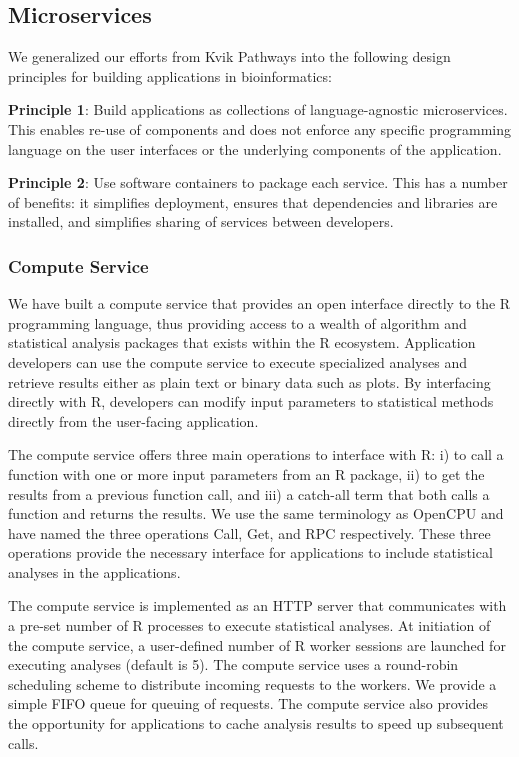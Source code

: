 \subsection{Microservices}\label{micrservices} 
We generalized our efforts from Kvik Pathways into the following design
principles for building applications in bioinformatics: 

\textbf{Principle 1}: Build applications as collections of language-agnostic
microservices. This enables re-use of components and does not enforce any
specific programming language on the user interfaces or the underlying
components of the application. 

\textbf{Principle 2}: Use software containers to package each service. This has
a number of benefits: it simplifies deployment, ensures that dependencies and
libraries are installed, and  simplifies sharing of services between
developers. 

\subsubsection{Compute Service}
We have built a compute service that provides an open interface directly to the
R programming language, thus providing access to a wealth of algorithm and
statistical analysis packages that exists within the R ecosystem.  
Application developers can use the compute service to execute specialized
analyses and retrieve results either as plain text or binary data such as plots.
By interfacing directly with R, developers can modify input parameters to
statistical methods directly from the user-facing application. 

The compute service offers three main operations to interface with R: i) to call
a function with one or more input parameters from an R package, ii) to get the
results from a previous function call, and iii) a catch-all term that both calls
a function and returns the results.  We use the same terminology as
OpenCPU\cite{opencpu} and have named the three operations Call, Get, and RPC
respectively. These three operations provide the necessary interface for
applications to include statistical analyses in the applications.

The compute service is implemented as an HTTP server that communicates with a
pre-set number of R processes to execute statistical analyses. 
At initiation of the compute service, a user-defined number of R worker sessions
are launched for executing analyses (default is 5).  
The compute service uses a round-robin scheduling scheme to distribute incoming
requests to the workers. We provide a simple FIFO queue for queuing of requests.
The compute service also provides the opportunity for applications to cache
analysis results to speed up subsequent calls. 

